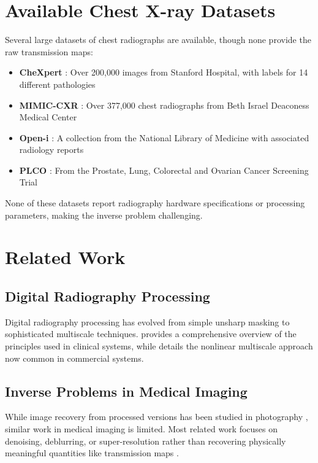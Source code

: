 \documentclass[nomenclature, english, bibtex]{kththesis}
\numberwithin{listing}{chapter}
\begin{document}
\section{Available Chest X-ray Datasets}
Several large datasets of chest radiographs are available, though none provide the raw transmission maps:
\begin{itemize}
    \item \textbf{CheXpert} \cite{irvin2019chexpert}: Over 200,000 images from Stanford Hospital, with labels for 14 different pathologies
    \item \textbf{MIMIC-CXR} \cite{johnson2019mimic}: Over 377,000 chest radiographs from Beth Israel Deaconess Medical Center
    \item \textbf{Open-i} \cite{demner2016preparing}: A collection from the National Library of Medicine with associated radiology reports
    
    \item \textbf{PLCO} \cite{gohagan2000prostate}: From the Prostate, Lung, Colorectal and Ovarian Cancer Screening Trial
\end{itemize}

None of these datasets report radiography hardware specifications or processing parameters, making the inverse problem challenging.

\section{Related Work}
\subsection{Digital Radiography Processing}
Digital radiography processing has evolved from simple unsharp masking to sophisticated multiscale techniques. \cite{prokop2003principles} provides a comprehensive overview of the principles used in clinical systems, while \cite{stahl2000digital} details the nonlinear multiscale approach now common in commercial systems.

\subsection{Inverse Problems in Medical Imaging}
While image recovery from processed versions has been studied in photography \cite{moran2020deeptone}, similar work in medical imaging is limited. Most related work focuses on denoising, deblurring, or super-resolution rather than recovering physically meaningful quantities like transmission maps \cite{jin2017deep}.
\end{document}
